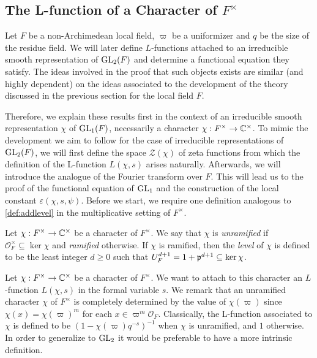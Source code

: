 \subsection{The L-function of a Character of \texorpdfstring{$F^\times$}{TEXT}}

Let $F$ be a non-Archimedean local field, $\varpi$ be a uniformizer and $q$ be the size of the residue field. We will later define $L$-functions attached to an irreducible smooth representation of $\mathrm{GL}_2(F)$ and determine a functional equation they satisfy. The ideas involved in the proof that such objects exists are similar (and highly dependent) on the ideas associated to the development of the theory discussed in the previous section for the local field $F$. 

Therefore, we explain these results first in the context of an irreducible smooth representation $\chi$ of $\mathrm{GL}_1(F)$, necessarily a character $\chi: F^\times \to \mathbb{C}^\times$. To mimic the development we aim to follow for the case of irreducible representations of $\mathrm{GL}_2(F)$, we will first define the space $\mathcal Z(\chi)$ of zeta functions from which the definition of the L-function $L(\chi,s)$ arises naturally. Afterwards, we will introduce the analogue of the Fourier transform over $F$. This will lead us to the proof of the functional equation of $\mathrm{GL}_1$ and the construction of the local constant $\varepsilon(\chi,s,\psi)$. Before we start, we require one definition analogous to \ref{def:addlevel} in the multiplicative setting of $F^\times$.

\begin{defn}
    Let $\chi:F^\times\to\mathbb{C}^\times$ be a character of $F^\times$. We say that $\chi$ is \textit{unramified} if $\mathcal{O}_F^\times\subseteq\ker\chi$ and \textit{ramified} otherwise. If $\chi$ is ramified, then the \textit{level} of $\chi$ is defined to be the least integer $d\geq0$ such that $U_F^{d+1}=1+\mathfrak{p}^{d+1}\subseteq\ker\chi$.
\end{defn}

Let $\chi: F^\times \to \mathbb{C}^\times$ be a character of $F^\times$. We want to attach to this character an $L$-function $L(\chi,s)$ in the formal variable $s$. We remark that an unramified character $\chi$ of $F^\times$ is completely determined by the value of $\chi(\varpi)$ since $\chi(x)=\chi(\varpi)^m$ for each $x\in\varpi^m\mathcal{O}_F$. Classically, the L-function associated to $\chi$ is defined to be $(1-\chi(\varpi)q^{-s})^{-1}$ when $\chi$ is unramified, and $1$ otherwise. In order to generalize to $\mathrm{GL}_2$ it would be preferable to have a more intrinsic definition.

